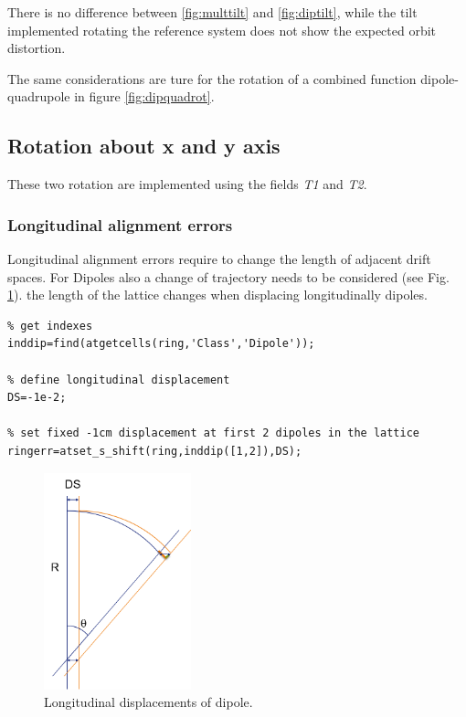 There is no difference between \ref{fig:multtilt} and \ref{fig:diptilt}, while the tilt implemented rotating the reference system does not show the expected orbit distortion.

The same considerations are ture for the rotation of a combined function dipole-quadrupole in figure \ref{fig:dipquadrot}. 


\clearpage
\subsection*{Rotation about x and y axis}
These two rotation are implemented using the fields \emph{T1} and \emph{T2}. 



\clearpage
\subsubsection*{Longitudinal alignment errors}
Longitudinal alignment errors require to change the length of adjacent drift spaces. For Dipoles also a change of trajectory needs to be considered (see Fig. \ref{fig:dipdsscheme}). the length of the lattice changes when displacing longitudinally dipoles.

\begin{lstlisting}
% get indexes
inddip=find(atgetcells(ring,'Class','Dipole'));

% define longitudinal displacement
DS=-1e-2; 

% set fixed -1cm displacement at first 2 dipoles in the lattice
ringerr=atset_s_shift(ring,inddip([1,2]),DS);

\end{lstlisting}

\begin{figure}[!thb]
	\centering
	\includegraphics[width=0.38\textwidth]{./images/LongitudinalDisplacement/DipoleDS.png}
	\caption{Longitudinal displacements of dipole.}
	\label{fig:dipdsscheme}
\end{figure}

